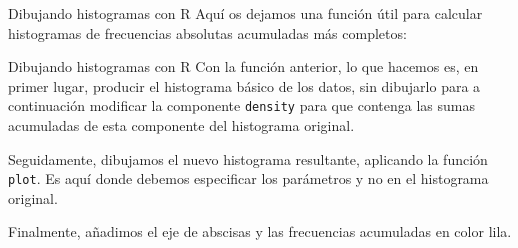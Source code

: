 \documentclass[
  ignorenonframetext,
  aspectratio=169]{beamer}
\newenvironment{Shaded}{\begin{snugshade}}{\end{snugshade}}
\newcommand{\AttributeTok}[1]{\textcolor[rgb]{0.77,0.63,0.00}{#1}}
\newcommand{\ConstantTok}[1]{\textcolor[rgb]{0.00,0.00,0.00}{#1}}
\newcommand{\ControlFlowTok}[1]{\textcolor[rgb]{0.13,0.29,0.53}{\textbf{#1}}}
\newcommand{\DecValTok}[1]{\textcolor[rgb]{0.00,0.00,0.81}{#1}}
\newcommand{\FunctionTok}[1]{\textcolor[rgb]{0.00,0.00,0.00}{#1}}
\newcommand{\NormalTok}[1]{#1}
\newcommand{\OtherTok}[1]{\textcolor[rgb]{0.56,0.35,0.01}{#1}}
\newcommand{\SpecialCharTok}[1]{\textcolor[rgb]{0.00,0.00,0.00}{#1}}
\newcommand{\StringTok}[1]{\textcolor[rgb]{0.31,0.60,0.02}{#1}}
\begin{document}
\begin{frame}[fragile]{Dibujando histogramas con R}
\protect\hypertarget{dibujando-histogramas-con-r-7}{}
Aquí os dejamos una función útil para calcular histogramas de
frecuencias absolutas acumuladas más completos:

\begin{Shaded}
\end{Shaded}
\end{frame}

\begin{frame}[fragile]{Dibujando histogramas con R}
\protect\hypertarget{dibujando-histogramas-con-r-8}{}
Con la función anterior, lo que hacemos es, en primer lugar, producir el
histograma básico de los datos, sin dibujarlo para a continuación
modificar la componente \texttt{density} para que contenga las sumas
acumuladas de esta componente del histograma original.

Seguidamente, dibujamos el nuevo histograma resultante, aplicando la
función \texttt{plot}. Es aquí donde debemos especificar los parámetros
y no en el histograma original.

Finalmente, añadimos el eje de abscisas y las frecuencias acumuladas en
color lila.
\end{frame}
\end{document}
